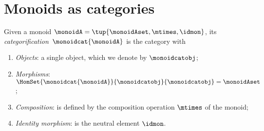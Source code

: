 
\section[Monoids as categories]{Monoids as categories}
\label{sec:monoids-as-cats}

\begin{ctdefinition}\label{def:monoidcat}
    Given a monoid $\monoidA = \tup{\monoidAset, \mtimes, \idmon}$, its \emph{categorification}~$\monoidcat{\monoidA}$ is the category with
    \begin{enumerate}
        \item \emph{Objects}: a single object, which we denote by $\monoidcatobj$;
        \item \emph{Morphisms}: $\HomSet{\monoidcat{\monoidA}}{\monoidcatobj}{\monoidcatobj} = \monoidAset$;
        \item \emph{Composition}: is defined by the composition operation $\mtimes$ of the monoid;
        \item \emph{Identity morphism}: is the neutral element $\idmon$. 
    \end{enumerate}
\end{ctdefinition}

